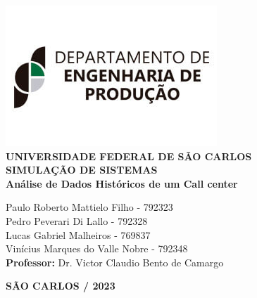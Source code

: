 \justifying %
\onehalfspacing %
\setlength{\parindent}{0cm}  %
\renewcommand*\familydefault{\rmdefault}
\thispagestyle{empty}
\begin{center}
\includegraphics[scale=0.6]{capa/logo-dep.jpg}\\
\vspace*{.8cm}
{\huge \textbf{UNIVERSIDADE FEDERAL DE SÃO CARLOS}}\\
\vspace*{.8cm}
{\Large \textbf{SIMULAÇÃO DE SISTEMAS}}\\
\vspace*{3cm}
{\Large \textbf{Análise de Dados Históricos de um Call center}}\\
\vspace*{4.5cm}
\begin{flushright}
    \onehalfspacing
    {\Large  Paulo Roberto Mattielo Filho - 792323}\\
    {\Large  Pedro Peverari Di Lallo - 792328}\\
    {\Large  Lucas Gabriel Malheiros - 769837}\\
    {\Large  Vinícius Marques do Valle Nobre - 792348}\\
    \vspace*{.3cm}
    {\Large \textbf{Professor:}}
    {\Large Dr. Victor Claudio Bento de Camargo}\\
\end{flushright}
\vspace*{\fill}
{\large \bf SÃO CARLOS / 2023}
\end{center}

